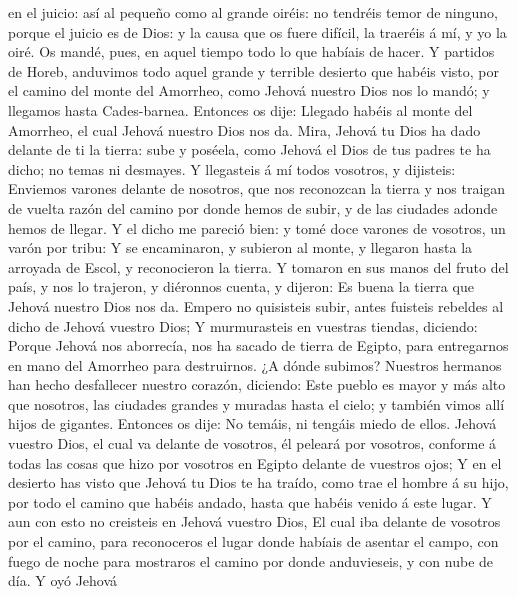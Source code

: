 en el juicio: así al pequeño como al grande oiréis: no tendréis temor de
ninguno, porque el juicio es de Dios: y la causa que os fuere difícil,
la traeréis á mí, y yo la oiré.  Os mandé, pues, en aquel
tiempo todo lo que habíais de hacer.  Y partidos de
Horeb, anduvimos todo aquel grande y terrible desierto que habéis visto,
por el camino del monte del Amorrheo, como Jehová nuestro Dios nos lo
mandó; y llegamos hasta Cades-barnea.  Entonces os dije:
Llegado habéis al monte del Amorrheo, el cual Jehová nuestro Dios nos
da.  Mira, Jehová tu Dios ha dado delante de ti la
tierra: sube y poséela, como Jehová el Dios de tus padres te ha dicho;
no temas ni desmayes.  Y llegasteis á mí todos vosotros,
y dijisteis: Enviemos varones delante de nosotros, que nos reconozcan la
tierra y nos traigan de vuelta razón del camino por donde hemos de
subir, y de las ciudades adonde hemos de llegar.  Y el
dicho me pareció bien: y tomé doce varones de vosotros, un varón por
tribu:  Y se encaminaron, y subieron al monte, y llegaron
hasta la arroyada de Escol, y reconocieron la tierra.  Y
tomaron en sus manos del fruto del país, y nos lo trajeron, y diéronnos
cuenta, y dijeron: Es buena la tierra que Jehová nuestro Dios nos da.
 Empero no quisisteis subir, antes fuisteis rebeldes al
dicho de Jehová vuestro Dios;  Y murmurasteis en vuestras
tiendas, diciendo: Porque Jehová nos aborrecía, nos ha sacado de tierra
de Egipto, para entregarnos en mano del Amorrheo para destruirnos.
 ¿A dónde subimos? Nuestros hermanos han hecho
desfallecer nuestro corazón, diciendo: Este pueblo es mayor y más alto
que nosotros, las ciudades grandes y muradas hasta el cielo; y también
vimos allí hijos de gigantes.  Entonces os dije: No
temáis, ni tengáis miedo de ellos.  Jehová vuestro Dios,
el cual va delante de vosotros, él peleará por vosotros, conforme á
todas las cosas que hizo por vosotros en Egipto delante de vuestros
ojos;  Y en el desierto has visto que Jehová tu Dios te
ha traído, como trae el hombre á su hijo, por todo el camino que habéis
andado, hasta que habéis venido á este lugar.  Y aun con
esto no creisteis en Jehová vuestro Dios,  El cual iba
delante de vosotros por el camino, para reconoceros el lugar donde
habíais de asentar el campo, con fuego de noche para mostraros el camino
por donde anduvieseis, y con nube de día.  Y oyó Jehová
